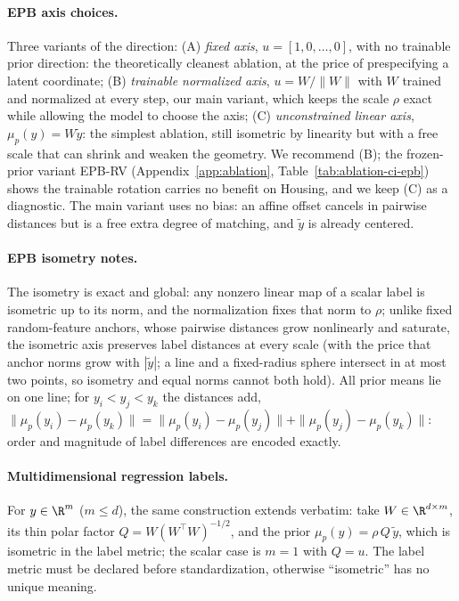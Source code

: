 \paragraph{EPB axis choices.} Three variants of the direction: (A) \emph{fixed
axis}, $u = [1, 0, \dots, 0]$, with no trainable prior direction: the
theoretically cleanest ablation, at the price of prespecifying a latent coordinate;
(B) \emph{trainable normalized axis}, $u = W/\|W\|$ with $W$ trained and normalized
at every step, our main variant, which keeps the scale $\rho$ exact while allowing
the model to choose the axis; (C) \emph{unconstrained linear axis},
$\mu_p(y) = W \tilde y$: the simplest ablation, still isometric by linearity but
with a free scale that can shrink and weaken the geometry. We recommend (B); the
frozen-prior variant EPB-RV (Appendix~\ref{app:ablation},
Table~\ref{tab:ablation-ci-epb}) shows the trainable rotation carries no benefit
on Housing, and we keep (C) as a diagnostic. The main variant uses no bias: an affine offset cancels in pairwise
distances but is a free extra degree of matching, and $\tilde y$ is already centered.

\paragraph{EPB isometry notes.} The isometry is exact and global: any nonzero linear
map of a scalar label is isometric up to its norm, and the normalization fixes that
norm to $\rho$; unlike fixed random-feature anchors, whose pairwise distances grow
nonlinearly and saturate, the isometric axis preserves label distances at every scale
(with the price that anchor norms grow with $|\tilde y|$; a line and a fixed-radius
sphere intersect in at most two points, so isometry and equal norms cannot both hold).
All prior means lie on one line; for $y_i < y_j < y_k$ the distances add,
$\|\mu_p(y_i)-\mu_p(y_k)\| = \|\mu_p(y_i)-\mu_p(y_j)\| + \|\mu_p(y_j)-\mu_p(y_k)\|$:
order and magnitude of label differences are encoded exactly.

\paragraph{Multidimensional regression labels.} For $y \in \R^m$ ($m \le d$), the
same construction extends verbatim: take $W \in \R^{d \times m}$, its thin polar
factor $Q = W (W^{\top}W)^{-1/2}$, and the prior $\mu_p(y) = \rho\, Q\, \tilde y$,
which is isometric in the label metric; the scalar case is $m = 1$ with $Q = u$. The
label metric must be declared before standardization, otherwise ``isometric'' has no
unique meaning.

